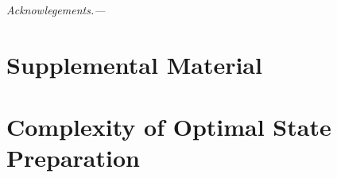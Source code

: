 \documentclass[showpacs,twocolumn,aps,floatfix,superscriptaddress,noshowpacs]{revtex4}
\begin{document}

\emph{Acknowlegements.---}




%

\newpage

\begin{widetext}

\section*{\large Supplemental Material}


\section{\label{sec:complexity}Complexity of Optimal State Preparation}

\end{widetext}
\end{document}
